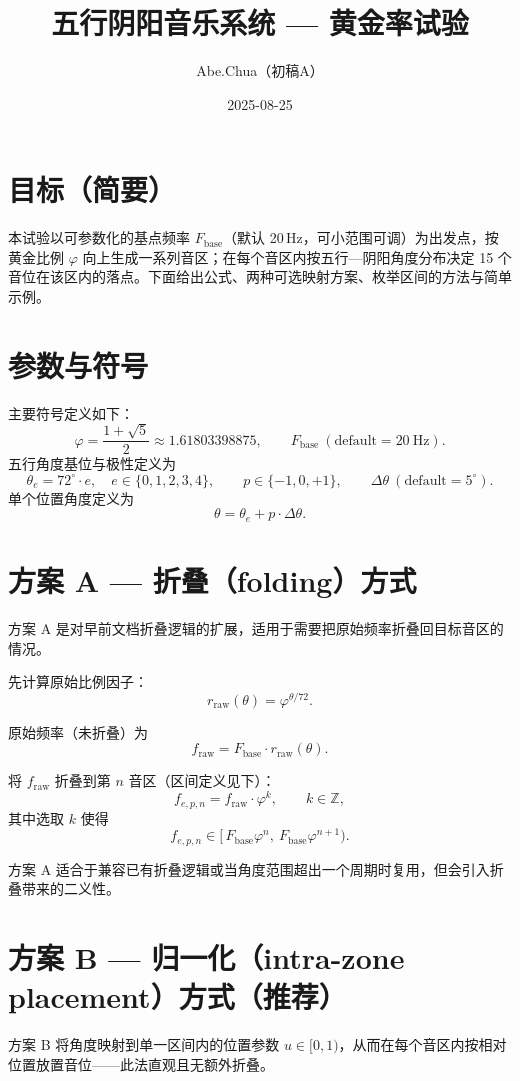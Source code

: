 \documentclass{article}
\title{五行阴阳音乐系统 — 黄金率试验}
\author{Abe.Chua（初稿A）}
\date{2025-08-25}
\begin{document}
\maketitle

\section*{目标（简要）}
本试验以可参数化的基点频率 \(F_{\mathrm{base}}\)（默认 20\,Hz，可小范围可调）为出发点，按黄金比例 \(\varphi\) 向上生成一系列音区；在每个音区内按五行—阴阳角度分布决定 15 个音位在该区内的落点。下面给出公式、两种可选映射方案、枚举区间的方法与简单示例。

\section*{参数与符号}
主要符号定义如下：
\[
\varphi=\frac{1+\sqrt5}{2}\approx1.61803398875,\qquad F_{\mathrm{base}}\ (\text{default}=20\ \mathrm{Hz}).
\]
五行角度基位与极性定义为
\[
\theta_e = 72^\circ\cdot e,\quad e\in\{0,1,2,3,4\},\qquad p\in\{-1,0,+1\},\qquad \Delta\theta\ (\text{default}=5^\circ).
\]
单个位置角度定义为
\[
\theta=\theta_e + p\cdot\Delta\theta.
\]

\section*{方案 A — 折叠（folding）方式}
方案 A 是对早前文档折叠逻辑的扩展，适用于需要把原始频率折叠回目标音区的情况。

先计算原始比例因子：
\[
r_{\mathrm{raw}}(\theta)=\varphi^{\theta/72}.
\]

原始频率（未折叠）为
\[
f_{\mathrm{raw}} = F_{\mathrm{base}}\cdot r_{\mathrm{raw}}(\theta).
\]

将 \(f_{\mathrm{raw}}\) 折叠到第 \(n\) 音区（区间定义见下）：
\[
f_{e,p,n} = f_{\mathrm{raw}}\cdot\varphi^{k},\qquad k\in\mathbb{Z},
\]
其中选取 \(k\) 使得
\[
f_{e,p,n}\in[\,F_{\mathrm{base}}\varphi^{n},\ F_{\mathrm{base}}\varphi^{n+1}).
\]

方案 A 适合于兼容已有折叠逻辑或当角度范围超出一个周期时复用，但会引入折叠带来的二义性。

\section*{方案 B — 归一化（intra-zone placement）方式（推荐）}
方案 B 将角度映射到单一区间内的位置参数 \(u\in[0,1)\)，从而在每个音区内按相对位置放置音位——此法直观且无额外折叠。
\end{document}
